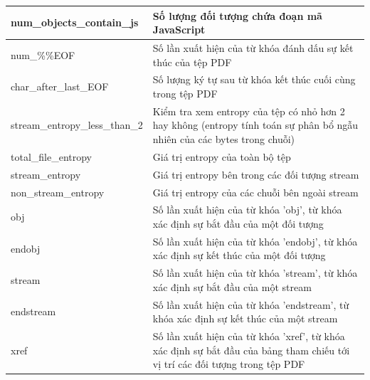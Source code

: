 \documentclass[./../main.tex]{subfiles}
\begin{document}
\begin{longtable}[c]{|p{}|p{}|}
	num\_objects\_contain\_js                 & Số lượng đối tượng chứa đoạn mã JavaScript                                                                                  \\ \hline
	num\_\%\%EOF                              & Số lần xuất hiện của từ khóa đánh dấu sự kết thúc của tệp PDF                                                               \\ \hline
	char\_after\_last\_EOF                    & Số lượng ký tự sau từ khóa kết thúc cuối cùng trong tệp PDF                                                                 \\ \hline
	stream\_entropy\_less\_than\_2            & Kiểm tra xem entropy của tệp có nhỏ hơn 2 hay không (entropy tính toán sự phân bổ ngẫu nhiên của các bytes trong chuỗi)     \\ \hline
	total\_file\_entropy                      & Giá trị entropy của toàn bộ tệp                                                                                             \\ \hline
	stream\_entropy                           & Giá trị entropy bên trong các đối tượng stream                                                                              \\ \hline
	non\_stream\_entropy                      & Giá trị entropy của các chuỗi bên ngoài stream                                                                              \\ \hline
	obj                                       & Số lần xuất hiện của từ khóa 'obj', từ khóa xác định sự bắt đầu của một đối tượng                                           \\ \hline
	endobj                                    & Số lần xuất hiện của từ khóa 'endobj', từ khóa xác định sự kết thúc của một đối tượng                                       \\ \hline
	stream                                    & Số lần xuất hiện của từ khóa 'stream', từ khóa xác định sự bắt đầu của một stream                                           \\ \hline
	endstream                                 & Số lần xuất hiện của từ khóa 'endstream', từ khóa xác định sự kết thúc của một stream                                       \\ \hline
	xref                                      & Số lần xuất hiện của từ khóa 'xref', từ khóa xác định sự bắt đầu của bảng tham chiếu tới vị trí các đối tượng trong tệp PDF \\ \hline

\end{longtable}
\end{document}
